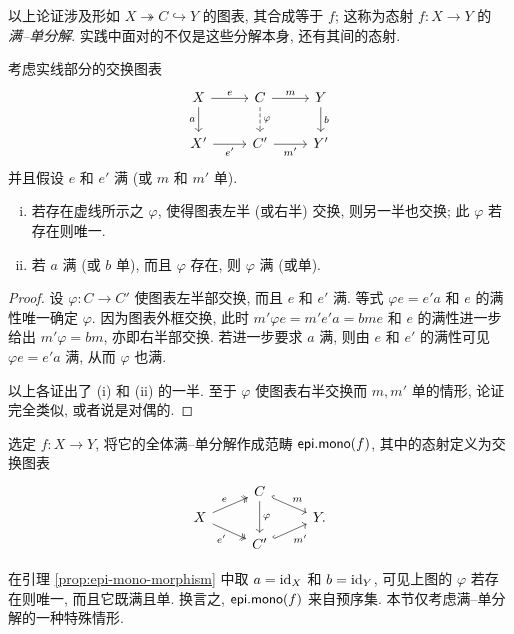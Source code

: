 以上论证涉及形如 $X \twoheadrightarrow C \hookrightarrow Y$ 的图表, 其合成等于 $f$; 这称为态射 $f: X \to Y$ 的\emph{满--单分解}. 实践中面对的不仅是这些分解本身, 还有其间的态射. 

\begin{lemma}\label{prop:epi-mono-morphism}
	考虑实线部分的交换图表
	\[\begin{tikzcd}
		X \arrow[r, "e"] \arrow[d, "a"'] & C \arrow[r, "m"] \arrow[dashed, d, "\varphi"] & Y \arrow[d, "b"] \\
		X' \arrow[r, "{e'}"'] & C' \arrow[r, "{m'}"'] & Y'
	\end{tikzcd}\]
	并且假设 $e$ 和 $e'$ 满 (或 $m$ 和 $m'$ 单).
	\begin{enumerate}[(i)]
		\item 若存在虚线所示之 $\varphi$, 使得图表左半 (或右半) 交换, 则另一半也交换; 此 $\varphi$ 若存在则唯一.
		\item 若 $a$ 满 (或 $b$ 单), 而且 $\varphi$ 存在, 则 $\varphi$ 满 (或单).
	\end{enumerate}
\end{lemma}
\begin{proof}
	设 $\varphi: C \to C'$ 使图表左半部交换, 而且 $e$ 和 $e'$ 满. 等式 $\varphi e = e' a$ 和 $e$ 的满性唯一确定 $\varphi$. 因为图表外框交换, 此时 $m' \varphi e = m' e' a = bm e$ 和 $e$ 的满性进一步给出 $m'\varphi = bm$, 亦即右半部交换. 若进一步要求 $a$ 满, 则由 $e$ 和 $e'$ 的满性可见 $\varphi e = e' a$ 满, 从而 $\varphi$ 也满.

	以上各证出了 (i) 和 (ii) 的一半. 至于 $\varphi$ 使图表右半交换而 $m, m'$ 单的情形, 论证完全类似, 或者说是对偶的.
\end{proof}

\begin{definition}
	选定 $f: X \to Y$, 将它的全体满--单分解作成范畴 $\mathsf{epi.mono}(f)$, 其中的态射定义为交换图表
	\[\begin{tikzcd}[row sep=tiny]
		& C \arrow[hookrightarrow, rd, "m"] \arrow[dd, "\varphi"] & \\
		X \arrow[twoheadrightarrow, ru, "e"] \arrow[twoheadrightarrow, rd, "{e'}"'] & & Y . \\
		& C' \arrow[hookrightarrow, ru, "{m'}"'] &
	\end{tikzcd}\]
\end{definition}

在引理 \ref{prop:epi-mono-morphism} 中取 $a = \mathrm{id}_X$ 和 $b = \mathrm{id}_Y$, 可见上图的 $\varphi$ 若存在则唯一, 而且它既满且单. 换言之, $\mathsf{epi.mono}(f)$ 来自预序集. 本节仅考虑满--单分解的一种特殊情形.

